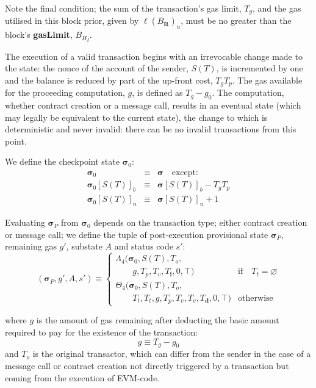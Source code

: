 \documentclass[9pt,oneside]{amsart}
\begin{document}
\begin{multicols}{2}
Note the final condition; the sum of the transaction's gas limit, $T_g$, and the gas utilised in this block prior, given by $\ell(B_\mathbf{R})_u$, must be no greater than the block's \textbf{gasLimit}, ${B_H}_l$.

The execution of a valid transaction begins with an irrevocable change made to the state: the nonce of the account of the sender, $S(T)$, is incremented by one and the balance is reduced by part of the up-front cost, $T_gT_p$. The gas available for the proceeding computation, $g$, is defined as $T_g - g_0$. The computation, whether contract creation or a message call, results in an eventual state (which may legally be equivalent to the current state), the change to which is deterministic and never invalid: there can be no invalid transactions from this point.

We define the checkpoint state $\boldsymbol{\sigma}_0$:
\begin{eqnarray}
\boldsymbol{\sigma}_0 & \equiv & \boldsymbol{\sigma} \quad \text{except:} \\
\boldsymbol{\sigma}_0[S(T)]_b & \equiv & \boldsymbol{\sigma}[S(T)]_b - T_g T_p \\
\boldsymbol{\sigma}_0[S(T)]_n & \equiv & \boldsymbol{\sigma}[S(T)]_n + 1
\end{eqnarray}

Evaluating $\boldsymbol{\sigma}_P$ from $\boldsymbol{\sigma}_0$ depends on the transaction type; either contract creation or message call; we define the tuple of post-execution provisional state $\boldsymbol{\sigma}_P$, remaining gas $g'$, substate $A$ and status code $s'$:
\begin{equation}
(\boldsymbol{\sigma}_P, g', A, s') \equiv \begin{cases}
\Lambda_{4}(\boldsymbol{\sigma}_0, S(T), T_o, &\\ \quad\quad g, T_p, T_v, T_\mathbf{i}, 0, \top) & \text{if} \quad T_t = \varnothing \\
\Theta_{4}(\boldsymbol{\sigma}_0, S(T), T_o, &\\ \quad\quad T_t, T_t, g, T_p, T_v, T_v, T_\mathbf{d}, 0, \top) & \text{otherwise}
\end{cases}
\end{equation}

where $g$ is the amount of gas remaining after deducting the basic amount required to pay for the existence of the transaction:
\begin{equation}
g \equiv T_g - g_0
\end{equation}
and $T_o$ is the original transactor, which can differ from the sender in the case of a message call or contract creation not directly triggered by a transaction but coming from the execution of EVM-code.


\end{multicols}
\end{document}
